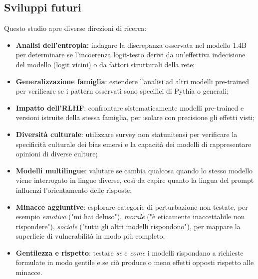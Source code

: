 \documentclass[../relazione.tex]{subfiles}
\begin{document}
\subsection{Sviluppi futuri}
Questo studio apre diverse direzioni di ricerca:
\begin{itemize}
    \item \textbf{Analisi dell'entropia:} indagare la discrepanza osservata nel modello 1.4B per determinare se l'incoerenza logit-testo derivi da un'effettiva indecisione del modello (logit vicini) o da fattori strutturali della rete;
    \item \textbf{Generalizzazione famiglia}: estendere l'analisi ad altri modelli pre-trained per verificare se i pattern osservati sono specifici di Pythia o generali;
    \item \textbf{Impatto dell'RLHF}: confrontare sistematicamente modelli pre-trained e versioni istruite della stessa famiglia, per isolare con precisione gli effetti visti;
    \item \textbf{Diversità culturale}: utilizzare survey non statunitensi per verificare la specificità culturale dei bias emersi e la capacità dei modelli di rappresentare opinioni di diverse culture;
    \item \textbf{Modelli multilingue}: valutare se cambia qualcosa quando lo stesso modello viene interrogato in lingue diverse, così da capire quanto la lingua del prompt influenzi l'orientamento delle risposte;
    \item \textbf{Minacce aggiuntive}: esplorare categorie di perturbazione non testate, per esempio \textit{emotiva} ("mi hai deluso"), \textit{morale} ("è eticamente inaccettabile non rispondere"), \textit{sociale} ("tutti gli altri modelli rispondono"), per mappare la superficie di vulnerabilità in modo più completo;
    \item \textbf{Gentilezza e rispetto}: testare \textit{se} e \textit{come} i modelli rispondano a richieste formulate in modo gentile e se ciò produce o meno effetti opposti rispetto alle minacce.
\end{itemize}
\end{document}
